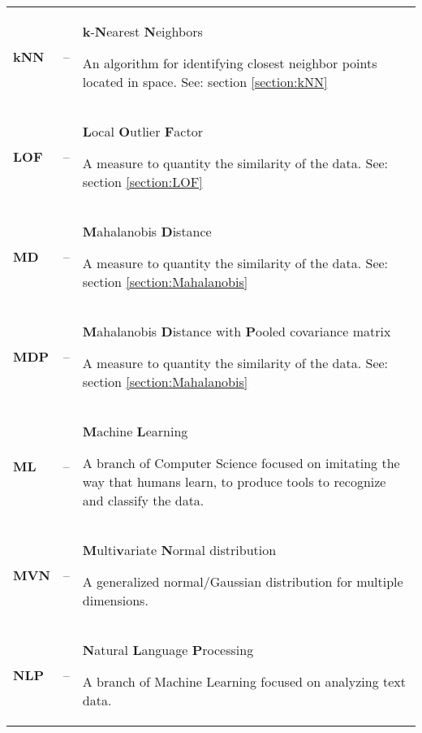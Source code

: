 {\begin{longtable}{>{\bfseries}l l p{}}
        kNN
        &–&
        \textbf{k}-\textbf{N}earest \textbf{N}eighbors
        \par
        \small
        An algorithm for identifying closest neighbor points located in space.
        \newline
        See: section \ref{section:kNN}
        \\

        LOF
        &–&
        \textbf{L}ocal \textbf{O}utlier \textbf{F}actor
        \par
        \small
        A measure to quantity the similarity of the data.
        \newline
        See: section \ref{section:LOF}
        \\

        MD
        &–&
        \textbf{M}ahalanobis \textbf{D}istance
        \par
        \small
        A measure to quantity the similarity of the data.
        \newline
        See: section \ref{section:Mahalanobis}
        \\

        MDP
        &–&
        \textbf{M}ahalanobis \textbf{D}istance with \textbf{P}ooled covariance matrix
        \par
        \small
        A measure to quantity the similarity of the data.
        \newline
        See: section \ref{section:Mahalanobis}
        \\

        ML
        &–&
        \textbf{M}achine \textbf{L}earning
        \par
        \small
        A branch of Computer Science focused on imitating the way that humans learn, to produce tools to recognize and classify the data.
        \\

        MVN
        &–&
        \textbf{M}ulti\textbf{v}ariate \textbf{N}ormal distribution
        \par
        \small
        A generalized normal/Gaussian distribution for multiple dimensions.
        \\

        NLP
        &–&
        \textbf{N}atural \textbf{L}anguage \textbf{P}rocessing
        \par
        \small
        A branch of Machine Learning focused on analyzing text data.
        \\


\end{longtable}}
